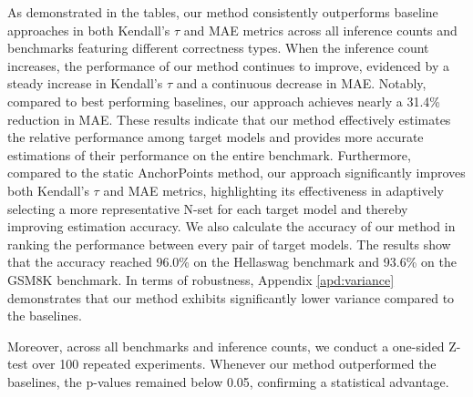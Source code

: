 
As demonstrated in the tables, our method consistently outperforms baseline approaches in both Kendall's $\tau$ and MAE metrics across all inference counts and benchmarks featuring different correctness types. When the inference count increases, the performance of our method continues to improve, evidenced by a steady increase in Kendall's $\tau$ and a continuous decrease in MAE. Notably, compared to best performing baselines, our approach achieves nearly a 31.4\% reduction in MAE. These results indicate that our method effectively estimates the relative performance among target models and provides more accurate estimations of their performance on the entire benchmark. Furthermore, compared to the static AnchorPoints method, our approach significantly improves both Kendall's $\tau$ and MAE metrics, highlighting its effectiveness in adaptively selecting a more representative N-set for each target model and thereby improving estimation accuracy. We also calculate the accuracy of our method in ranking the performance between every pair of target models. The results show that the accuracy reached 96.0\% on the Hellaswag benchmark and 93.6\% on the GSM8K benchmark. In terms of robustness, Appendix \ref{apd:variance} demonstrates that our method exhibits significantly lower variance compared to the baselines. 

Moreover, across all benchmarks and inference counts, we conduct a one-sided Z-test over 100 repeated experiments. Whenever our method outperformed the baselines, the p-values remained below 0.05, confirming a statistical advantage.

    
